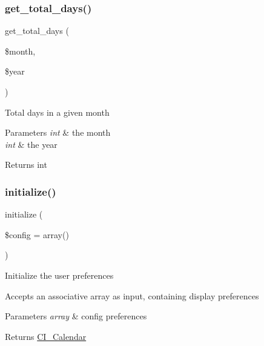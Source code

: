 \subsubsection{\texorpdfstring{get\+\_\+total\+\_\+days()}{get\_total\_days()}}
{\footnotesize\ttfamily get\+\_\+total\+\_\+days (\begin{DoxyParamCaption}\item[{}]{\$month,  }\item[{}]{\$year }\end{DoxyParamCaption})}

Total days in a given month


\begin{DoxyParams}{Parameters}
{\em int} & the month \\
\hline
{\em int} & the year \\
\hline
\end{DoxyParams}
\begin{DoxyReturn}{Returns}
int 
\end{DoxyReturn}
\mbox{\label{class_c_i___calendar_a481385e36d920f5a5005ace05c6cd016}} 
\subsubsection{\texorpdfstring{initialize()}{initialize()}}
{\footnotesize\ttfamily initialize (\begin{DoxyParamCaption}\item[{}]{\$config = {\ttfamily array()} }\end{DoxyParamCaption})}

Initialize the user preferences

Accepts an associative array as input, containing display preferences


\begin{DoxyParams}{Parameters}
{\em array} & config preferences \\
\hline
\end{DoxyParams}
\begin{DoxyReturn}{Returns}
\mbox{\hyperlink{class_c_i___calendar}{C\+I\+\_\+\+Calendar}} 
\end{DoxyReturn}
\mbox{\label{class_c_i___calendar_ac0331959620d18320ab6587621730d44}} 
